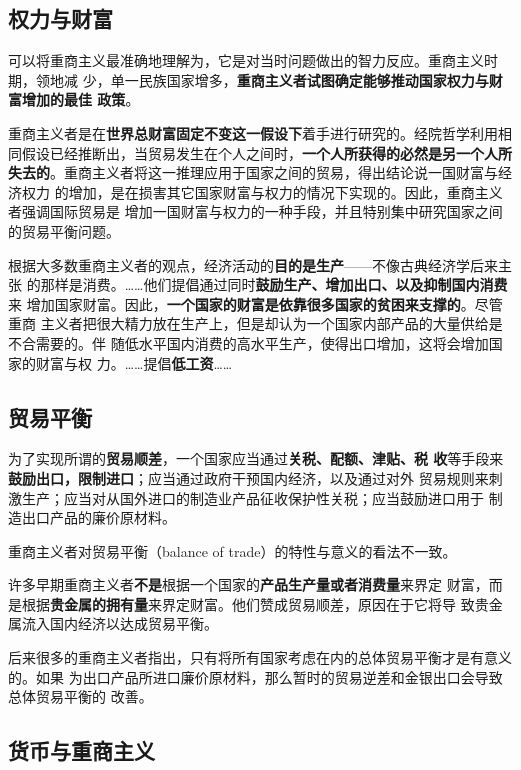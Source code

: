 \subsection{权力与财富}

可以将重商主义最准确地理解为，它是对当时问题做出的智力反应。重商主义时期，领地减
少，单一民族国家增多，\textbf{重商主义者试图确定能够推动国家权力与财富增加的最佳
  政策}。

重商主义者是在\textbf{世界总财富固定不变这一假设下}着手进行研究的。经院哲学利用相
同假设已经推断出，当贸易发生在个人之间时，\textbf{一个人所获得的必然是另一个人所
  失去的}。重商主义者将这一推理应用于国家之间的贸易，得出结论说一国财富与经济权力
的增加，是在损害其它国家财富与权力的情况下实现的。因此，重商主义者强调国际贸易是
增加一国财富与权力的一种手段，并且特别集中研究国家之间的贸易平衡问题。

根据大多数重商主义者的观点，经济活动的\textbf{目的是生产}——不像古典经济学后来主张
的那样是消费。……他们提倡通过同时\textbf{鼓励生产、增加出口、以及抑制国内消费}来
增加国家财富。因此，\textbf{一个国家的财富是依靠很多国家的贫困来支撑的}。尽管重商
主义者把很大精力放在生产上，但是却认为一个国家内部产品的大量供给是不合需要的。伴
随低水平国内消费的高水平生产，使得出口增加，这将会增加国家的财富与权
力。……提倡\textbf{低工资}……

\subsection{贸易平衡}

为了实现所谓的\textbf{贸易顺差}，一个国家应当通过\textbf{关税、配额、津贴、税
  收}等手段来\textbf{鼓励出口，限制进口}；应当通过政府干预国内经济，以及通过对外
贸易规则来刺激生产；应当对从国外进口的制造业产品征收保护性关税；应当鼓励进口用于
制造出口产品的廉价原材料。

重商主义者对贸易平衡（balance of trade）的特性与意义的看法不一致。

许多早期重商主义者\textbf{不是}根据一个国家的\textbf{产品生产量或者消费量}来界定
财富，而是根据\textbf{贵金属的拥有量}来界定财富。他们赞成贸易顺差，原因在于它将导
致贵金属流入国内经济以达成贸易平衡。

后来很多的重商主义者指出，只有将所有国家考虑在内的总体贸易平衡才是有意义的。如果
为出口产品所进口廉价原材料，那么暂时的贸易逆差和金银出口会导致总体贸易平衡的
改善。

\subsection{货币与重商主义}

